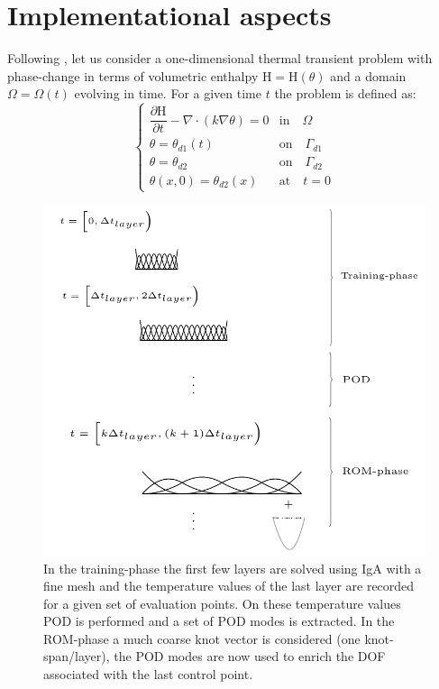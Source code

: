 \documentclass[3p]{article}
\begin{document}
\section*{Implementational aspects}

Following \cite{Celentano1994}, let us consider a one-dimensional thermal transient problem with phase-change in terms of volumetric enthalpy $\mathrm{H}=\mathrm{H}(\theta)$ and a domain $\Omega = \Omega(t)$ evolving in time. For a given time $t$ the problem is defined as:
\begin{equation}
\begin{cases}
    \dfrac{\partial\mathrm{H}}{\partial t}-\nabla \cdot (k\nabla\theta)=0 & \text{in}\quad \Omega \\
 	\theta = \theta_{d1}(t) & \text{on}\quad \Gamma_{d1} \\
 	\theta = \theta_{d2} & \text{on}\quad \Gamma_{d2} \\
 	\theta(x, 0) = \theta_{d2}(x) & \text{at}\quad t=0
\end{cases}
\label{PoissonTransientProblem}
\end{equation}

\begin{figure}[h!]
\centering
\includegraphics[width=0.8\linewidth]{externals/Pictures/PODXIGAScheme.pdf}
\caption{In the training-phase the first few layers are solved using IgA with a fine mesh and the temperature values of the last layer are recorded for a given set of evaluation points. On these temperature values POD is performed and a set of POD modes is extracted. In the ROM-phase a much coarse knot vector is considered (one knot-span/layer), the POD modes are now used to enrich the DOF associated with the last control point.}
\label{PODXIGAScheme}
\end{figure}
\end{document}
